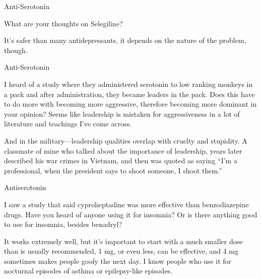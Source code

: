 \documentclass[11pt,oneside,openany,extrafontsizes]{memoir}
\begin{document}
\begin{qaexchange}{Anti-Serotonin}

    \begin{question}
        What are your thoughts on Selegiline?
    \end{question}

    \begin{answer}
        It's safer than many antidepressants, it depends on the nature of the problem, though.
    \end{answer}
\end{qaexchange}

\begin{emailexchange}{Anti-Serotonin}

    \begin{question}
        I heard of a study where they administered serotonin to low ranking monkeys in a pack and after administration, they became leaders in the pack. Does this have to do more with becoming more aggressive, therefore becoming more dominant in your opinion? Seems like leadership is mistaken for aggressiveness in a lot of literature and teachings I've come across.
    \end{question}

    \begin{answer}
        And in the military—leadership qualities overlap with cruelty and stupidity. A classmate of mine who talked about the importance of leadership, years later described his war crimes in Vietnam, and then was quoted as saying \enquote{I'm a professional, when the president says to shoot someone, I shoot them.}
    \end{answer}
\end{emailexchange}

\begin{qaexchange}{Antiserotonin}

    \begin{question}
        I saw a study that said cyproheptadine was more effective than benzodiazepine drugs. Have you heard of anyone using it for insomnia? Or is there anything good to use for insomnia, besides benadryl?
    \end{question}

    \begin{answer}
      It works extremely well, but it's important to start with a much smaller dose than is usually recommended, 1 mg, or even less, can be effective, and 4 mg sometimes makes people goofy the next day. I know people who use it for nocturnal episodes of asthma or epilepsy-like episodes.
    \end{answer}
\end{qaexchange}
\end{document}
